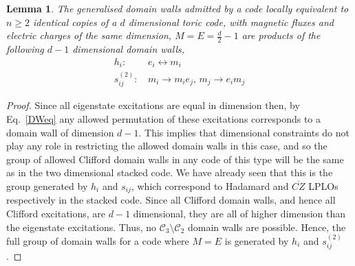\documentclass[pra,twocolumn,a4paper,nofootinbib]{revtex4-1}
\newtheorem{lem}{Lemma}
\begin{document}
\begin{lem}\label{l1}
The generalised domain walls admitted by a code locally equivalent to $n \geq 2$ identical copies of a $d$ dimensional toric code, with magnetic fluxes and electric charges of the same dimension, $M=E=\frac{d}{2}-1$ are products of the following $d-1$ dimensional domain walls,
\begin{align}
h_i: & \, e_i \leftrightarrow m_i\\
s_{ij}^{(2)}: & \, m_i \to m_ie_j,\, m_j \to e_im_j
\end{align}
\end{lem}
\begin{proof}
Since all eigenstate excitations are equal in dimension then, by Eq.~\ref{DWeq} any allowed permutation of these excitations corresponds to a domain wall of dimension $d-1$. This implies that dimensional constraints do not play any role in restricting the allowed domain walls in this case, and so the group of allowed Clifford domain walls in any code of this type will be the same as in the two dimensional stacked code. We have already seen that this is the group generated by $h_i$ and $s_{ij}$, which correspond to Hadamard and $\overline{CZ}$ LPLOs respectively in the stacked code. Since all Clifford domain walls, and hence all Clifford excitations, are $d-1$ dimensional, they are all of higher dimension than the eigenstate excitations. Thus, no $\mathcal{C}_3 \setminus \mathcal{C}_2$ domain walls are possible. Hence, the full group of domain walls for a code where $M=E$ is generated by $h_i$ and $s_{ij}^{(2)}$.
\end{proof}
\end{document}
